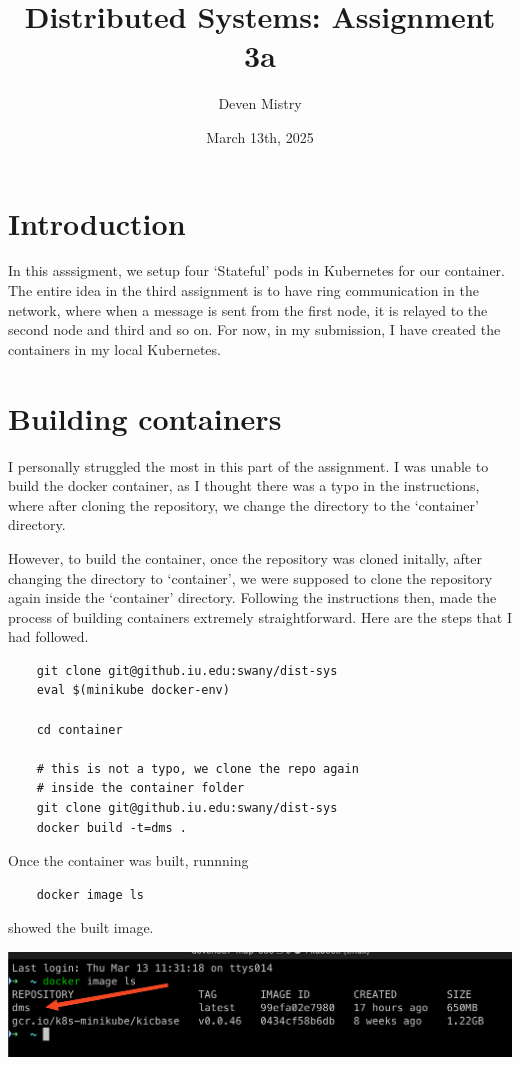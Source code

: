 \documentclass{article}
\title{Distributed Systems: Assignment 3a}
\author{Deven Mistry}
\date{March 13th, 2025}
\begin{document}
\maketitle

\section{Introduction}

In this asssigment, we setup four `Stateful' pods in Kubernetes for our container. The entire idea in the third assignment is to have ring communication in the network, where when a message is sent from the first node, it is relayed to the second node and third and so on. For now, in my submission, I have created the containers in my local Kubernetes.

\section{Building containers}

I personally struggled the most in this part of the assignment. I was unable to build the docker container, as I thought there was a typo in the instructions, where after cloning the repository, we change the directory to the `container' directory.

However, to build the container, once the repository was cloned initally, after changing the directory to `container', we were supposed to clone the repository again inside the `container' directory. Following the instructions then, made the process of building containers extremely straightforward. Here are the steps that I had followed.

\begin{lstlisting}
    git clone git@github.iu.edu:swany/dist-sys
    eval $(minikube docker-env)

    cd container

    # this is not a typo, we clone the repo again
    # inside the container folder
    git clone git@github.iu.edu:swany/dist-sys
    docker build -t=dms .
\end{lstlisting}

Once the container was built, runnning
\begin{lstlisting}
    docker image ls
\end{lstlisting}

showed the built image.

\begin{center}
    \includegraphics[scale=0.5]{docker-img.png}
\end{center}
\end{document}
